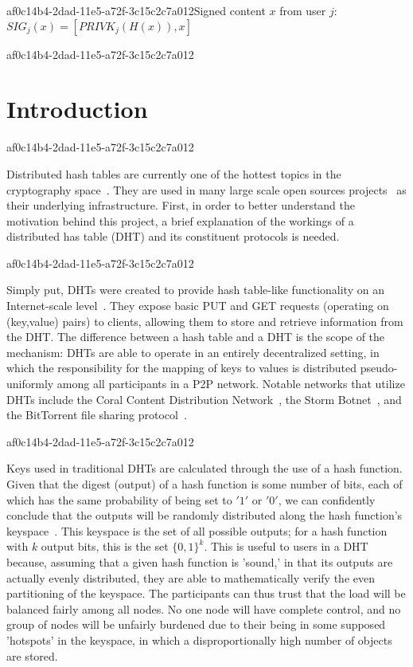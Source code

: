 \documentclass[12pt]{article}
\begin{document}
af0c14b4-2dad-11e5-a72f-3c15c2c7a012Signed content $x$ from user $j$: $SIG_j(x) = \left[ PRIVK_j( H(x) ), x \right]$

af0c14b4-2dad-11e5-a72f-3c15c2c7a012\section{Introduction}
af0c14b4-2dad-11e5-a72f-3c15c2c7a012\par Distributed hash tables are currently one of the hottest topics in the cryptography space~\cite{Stoica:2001dj,Rowstron:2001ea,Ratnasamy:2001wn}. They are used in many large scale open sources projects~\cite{Freitas:2013tb,Xu:2010vs,Perfitt:2010fh} as their underlying infrastructure. First, in order to better understand the motivation behind this project, a brief explanation of the workings of a distributed has table (DHT) and its constituent protocols is needed.

af0c14b4-2dad-11e5-a72f-3c15c2c7a012\par Simply put, DHTs were created to provide hash table-like functionality on an Internet-scale level~\cite{Ratnasamy:2001wn}. They expose basic PUT and GET requests (operating on (key,value) pairs) to clients, allowing them to store and retrieve information from the DHT. The difference between a hash table and a DHT is the scope of the mechanism: DHTs are able to operate in an entirely decentralized setting, in which the responsibility for the mapping of keys to values is distributed pseudo-uniformly among all participants in a P2P network. Notable networks that utilize DHTs include the Coral Content Distribution Network~\cite{Freedman:2004vb}, the Storm Botnet~\cite{Holz:2008uk}, and the BitTorrent file sharing protocol~\cite{Cohen:y1_8mBnw}.

af0c14b4-2dad-11e5-a72f-3c15c2c7a012\par Keys used in traditional DHTs are calculated through the use of a hash function. Given that the digest (output) of a hash function is some number of bits, each of which has the same probability of being set to $'1'$ or $'0'$, we can confidently conclude that the outputs will be randomly distributed along the hash function's keyspace~. This keyspace is the set of all possible outputs; for a hash function with $k$ output bits, this is the set $\{0,1\}^k$. This is useful to users in a DHT because, assuming that a given hash function is 'sound,' in that its outputs are actually evenly distributed, they are able to mathematically verify the even partitioning of the keyspace. The participants can thus trust that the load will be balanced fairly among all nodes. No one node will have complete control, and no group of nodes will be unfairly burdened due to their being in some supposed 'hotspots' in the keyspace, in which a disproportionally high number of objects are stored.~
\end{document}
